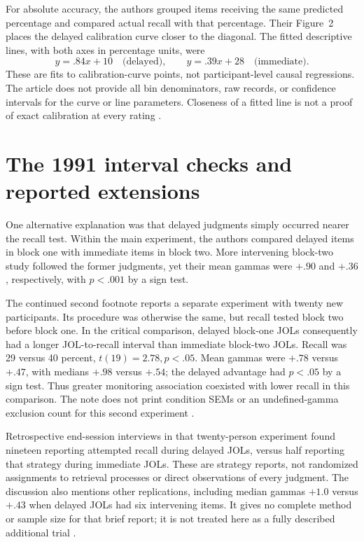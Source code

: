 For absolute accuracy, the authors grouped items receiving the
same predicted percentage and compared actual recall with that
percentage. Their Figure~2 places the delayed calibration curve
closer to the diagonal. The fitted descriptive lines, with both
axes in percentage units, were
\[
 y=.84x+10\quad\text{(delayed)},\qquad
 y=.39x+28\quad\text{(immediate)}.
\]
These are fits to calibration-curve points, not participant-level
causal regressions. The article does not provide all bin denominators,
raw records, or confidence intervals for the curve or line parameters.
Closeness of a fitted line is not a proof of exact calibration at
every rating \cite[p.~269, note~3]{NelsonDunlosky1991DelayedJOL}.

\section{The 1991 interval checks and reported extensions}
\label{sec:p19-jol-1991-controls}

One alternative explanation was that delayed judgments simply
occurred nearer the recall test. Within the main experiment,
the authors compared delayed items in block one with immediate
items in block two. More intervening block-two study followed the
former judgments, yet their mean gammas were \(+.90\) and \(+.36\),
respectively, with \(p<.001\) by a sign test.

The continued second footnote reports a separate experiment with
twenty new participants. Its procedure was otherwise the same,
but recall tested block two before block one. In the critical
comparison, delayed block-one JOLs consequently had a longer
JOL-to-recall interval than immediate block-two JOLs.
Recall was 29 versus 40 percent, \(t(19)=2.78,p<.05\).
Mean gammas were \(+.78\) versus \(+.47\), with medians \(+.98\)
versus \(+.54\); the delayed advantage had \(p<.05\) by a sign test.
Thus greater monitoring association coexisted with lower recall
in this comparison. The note does not print condition SEMs or
an undefined-gamma exclusion count for this second experiment
\cite[pp.~268--269, note~2]{NelsonDunlosky1991DelayedJOL}.

Retrospective end-session interviews in that twenty-person
experiment found nineteen reporting attempted recall during delayed
JOLs, versus half reporting that strategy during immediate JOLs.
These are strategy reports, not randomized assignments to retrieval
processes or direct observations of every judgment.
The discussion also mentions other replications, including median
gammas \(+1.0\) versus \(+.43\) when delayed JOLs had six intervening
items. It gives no complete method or sample size for that brief
report; it is not treated here as a fully described additional trial
\cite[p.~270 and note~4]{NelsonDunlosky1991DelayedJOL}.

